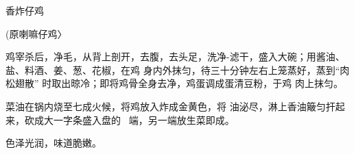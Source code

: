 \begin{recipe}{香炸仔鸡}

(原喇嘛仔鸡〉

\ingredients


\cooking

\step 鸡宰杀后，净毛，从背上剖开，去腹，去头足，洗净-滤干，盛入大碗；用酱油、盐、料酒、姜、葱、花椒，在鸡 身内外抹匀，待三十分钟左右上笼蒸好，蒸到“肉松翅散” 时取出晾冷；即将鸡骨全身去净，鸡蛋调成蛋清豆粉，于鸡 肉上抹匀。

\step 菜油在锅内烧至七成火候，将鸡放入炸成金黄色，将 油泌尽，淋上香油簸匀扞起来，砍成大一字条盛入盘的~ 端，另一端放生菜即成。

\notes

色泽光润，味道脆嫩。

\end{recipe}

